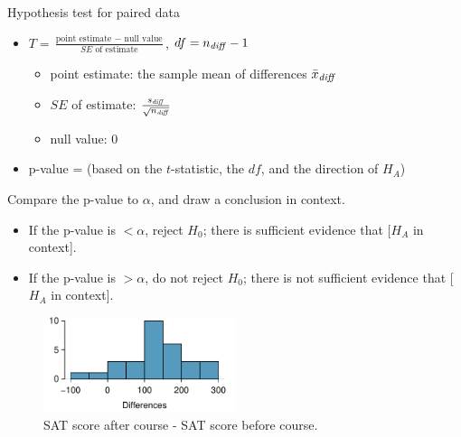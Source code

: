 \begin{onebox}{Hypothesis test for paired data}
\begin{itemize}
\item[] $T = \frac{\text{point estimate } - \text{ null value}}{SE \text{ of estimate}}$,  \quad $df=n_{\text{\emph{diff}}} -1$
\begin{itemize}
\item[] point estimate: the sample mean of differences $\bar{x}_{\text{\emph{diff}}} $
\item[] $SE$ of estimate:  $\frac{s_{\text{\emph{diff}}} }{\sqrt{n_{\text{\emph{diff}}} }}$
\item[] null value: $0$
\end{itemize}
\item[] p-value = (based on the $t$-statistic, the $df$, and the direction of $H_A$)
\end{itemize}
  Compare the p-value to $\alpha$, and draw a conclusion in context.\vspace{-1mm}
\begin{itemize}
\item[] If the p-value is $< \alpha$, reject $H_0$; there is sufficient evidence that [$H_A$ in context]. 
\item[] If the p-value is $> \alpha$, do not reject $H_0$; there is not sufficient evidence that [$H_A$ in context].
\end{itemize}\end{onebox}



\begin{figure}[h]
\centering
\includegraphics[width=0.5\textwidth]{ch_inference_for_means/figures/satImprovementHTDataHistogram/satImprovementHTDataHistogram}
\caption{SAT score after course - SAT score before course. }
\label{satImprovementHTDataHistogramrepeat}
\end{figure}

